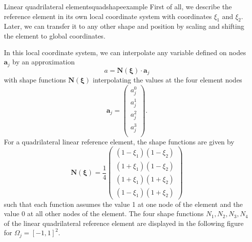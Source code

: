 \begin{example}{Linear quadrilateral elements}{quadshapeexample} 
    First of all, we describe the reference element in its own local coordinate system with coordinates $\xi_1$ and $\xi_2$. Later, we can transfer it to any other shape and position by scaling and shifting the element to global coordinates. 

    \begin{center}
        
    \end{center}

    In this local coordinate system, we can interpolate any variable defined on nodes $\mathbf{a}_j$ by an approximation
    \begin{equation}
        a = \mathbf{N}(\pmb{\xi}) \cdot  \mathbf{a}_j
    \end{equation}
    with shape functions $\mathbf{N}(\pmb{\xi})$ interpolating the values at the four element nodes
    \begin{equation}
        \mathbf{a}_j = 
        \begin{pmatrix}
            a_j^0\\ 
            a_j^1\\ 
            a_j^2\\ 
            a_j^3\\
        \end{pmatrix}.
    \end{equation}
    For a quadrilateral linear reference element, the shape functions are given by 
    \begin{equation}
        \mathbf{N}(\pmb{\xi}) = \frac{1}{4}
        \begin{pmatrix}
            (1-\xi_1)(1-\xi_2) \\
            (1+\xi_1)(1-\xi_2) \\
            (1+\xi_1)(1+\xi_2) \\
            (1-\xi_1)(1+\xi_2)
        \end{pmatrix}
    \end{equation}
    such that each function assumes the value 1 at one node of the element and the value 0 at all other nodes of the element. The four shape functions $N_1, N_2, N_3, N_4$ of the linear quadrilateral reference element are displayed in the following figure for $\Omega_j = [-1,1]^2$.
    


\end{example}
